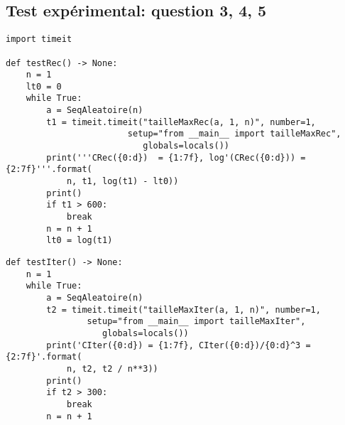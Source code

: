 \documentclass[french]{article}
\begin{document}
\subsection{Test expérimental: question 3, 4, 5}
\begin{lstlisting}
import timeit

def testRec() -> None:
    n = 1
    lt0 = 0
    while True:
        a = SeqAleatoire(n)
        t1 = timeit.timeit("tailleMaxRec(a, 1, n)", number=1,
                        setup="from __main__ import tailleMaxRec",
                           globals=locals())
        print('''CRec({0:d})  = {1:7f}, log'(CRec({0:d})) = {2:7f}'''.format(
            n, t1, log(t1) - lt0))
        print()
        if t1 > 600: 
            break
        n = n + 1
        lt0 = log(t1)
\end{lstlisting}
\pagebreak
\begin{lstlisting}
def testIter() -> None:
    n = 1
    while True:
        a = SeqAleatoire(n)
        t2 = timeit.timeit("tailleMaxIter(a, 1, n)", number=1,
                setup="from __main__ import tailleMaxIter",
                   globals=locals())
        print('CIter({0:d}) = {1:7f}, CIter({0:d})/{0:d}^3 = {2:7f}'.format(
            n, t2, t2 / n**3))
        print()
        if t2 > 300: 
            break
        n = n + 1

\end{lstlisting}
\end{document}
